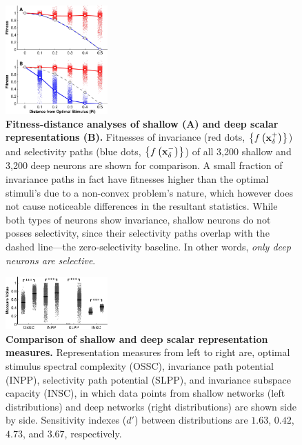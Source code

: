 \documentclass[10pt,twocolumn,letterpaper]{article}
\begin{document}
\begin{figure}
\begin{center}
\includegraphics[width=0.35\textwidth]{Figs/e_fig3a_2-crop-nup-crop.pdf} 
\end{center}
\caption{{\bf Fitness-distance analyses of shallow (A) and deep scalar representations (B).}
Fitnesses of invariance (red dots, \ie $\left\lbrace f\left(\bf{x}^{+}_{\delta}\right) \right\rbrace$) and selectivity paths (blue dots, \ie $\left\lbrace f\left(\bf{x}^{-}_{\delta}\right) \right\rbrace$) of all 3,200 shallow and 3,200 deep neurons are shown for comparison.
A small fraction of invariance paths in fact have fitnesses higher than the optimal stimuli's due to a non-convex problem's nature, which however does not cause noticeable differences in the resultant statistics.
While both types of neurons show invariance, shallow neurons do not posses selectivity, since their selectivity paths overlap with the dashed line---the zero-selectivity baseline.
In other words, \emph{only deep neurons are selective}.
} %
\label{fig:fda}
\end{figure}

\begin{figure}
\begin{center}
\includegraphics[width=0.35\textwidth]{Figs/e_fig23b-crop.pdf} 
\end{center}
\caption{{\bf Comparison of shallow and deep scalar representation measures.}
Representation measures from left to right are, optimal stimulus spectral complexity (OSSC), invariance path potential (INPP), selectivity path potential (SLPP), and invariance subspace capacity (INSC), in which data points from shallow networks (left distributions) and deep networks (right distributions) are shown side by side.
Sensitivity indexes ($d'$) between distributions are $1.63$, $0.42$, $4.73$, and $3.67$, respectively.
}
\label{fig:pair}
\end{figure}
\end{document}
